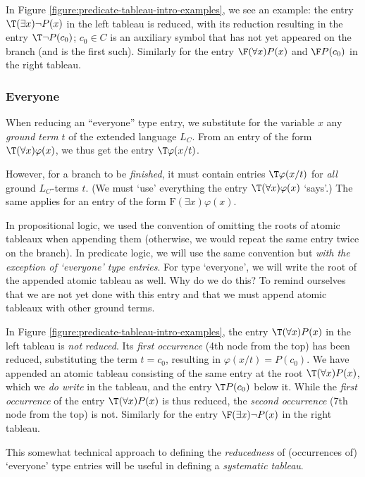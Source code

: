 In Figure \ref{figure:predicate-tableau-intro-examples}, we see an example: the entry $\T(\exists x)\neg P(x)$ in the left tableau is reduced, with its reduction resulting in the entry $\T\neg P(c_0)$; $c_0\in C$ is an auxiliary symbol that has not yet appeared on the branch (and is the first such). Similarly for the entry $\F(\forall x)P(x)$ and $\F P(c_0)$ in the right tableau.

\subsubsection{Everyone}
When reducing an ``everyone'' type entry, we substitute for the variable $x$ any \emph{ground term} $t$ of the extended language $L_C$. From an entry of the form $\T(\forall x)\varphi(x)$, we thus get the entry $\T\varphi(x/t)$.

However, for a branch to be \emph{finished}, it must contain entries $\T\varphi(x/t)$ for \emph{all} ground $L_C$-terms $t$. (We must `use' everything the entry $\T(\forall x)\varphi(x)$ `says'.) The same applies for an entry of the form $\mathrm{F}(\exists x)\varphi(x)$.

In propositional logic, we used the convention of omitting the roots of atomic tableaux when appending them (otherwise, we would repeat the same entry twice on the branch). In predicate logic, we will use the same convention but \emph{with the exception of `everyone' type entries}. For type `everyone', we will write the root of the appended atomic tableau as well. Why do we do this? To remind ourselves that we are not yet done with this entry and that we must append atomic tableaux with other ground terms.

In Figure \ref{figure:predicate-tableau-intro-examples}, the entry $\T(\forall x)P(x)$ in the left tableau is \emph{not} \emph{reduced}. Its \emph{first occurrence} (4th node from the top) has been reduced, substituting the term $t=c_0$, resulting in $\varphi(x/t)=P(c_0)$. We have appended an atomic tableau consisting of the same entry at the root $\T(\forall x)P(x)$, which we \emph{do write} in the tableau, and the entry $\T P(c_0)$ below it. While the \emph{first occurrence} of the entry $\T(\forall x)P(x)$ is thus reduced, the \emph{second occurrence} (7th node from the top) is not. Similarly for the entry $\F(\exists x)\neg P(x)$ in the right tableau.

This somewhat technical approach to defining the \emph{reducedness} of (occurrences of) `everyone' type entries will be useful in defining a \emph{systematic tableau}.

